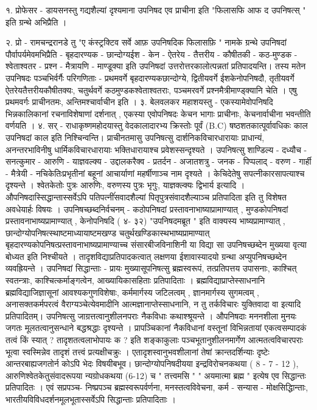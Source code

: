१. प्रोफेसर - डायसनस्तु गद्यशैल्यां दृश्यमाना उपनिषद एव प्राचीना इति "फिलासफि आफ द उपनिषत्स् " इति ग्रन्थे अभिप्रैति । 

२. प्रो - रामचन्द्ररानडे तु "ए कंस्ट्रक्टिव सर्वे आफ़ उपनिषदिक फिलासफ़ि " नामके ग्रन्थे उपनिषदां पौर्वापर्यमेवमभिप्रैति - बृहदारण्यक - छान्दोग्यईश - केन - ऐतरेय - तैत्तरीय - कौषीतकी - कठ-मुण्डक - श्वेताश्वतर - प्रश्न - मैत्रायणि - माण्डूक्या इति उपनिषदां उत्तरोत्तरकालोत्पन्नतां प्रतिपादयन्ति। तस्य मतेन उपनिषदः पञ्चभिर्वर्गैः परिगणिताः - प्रथमवर्गे बृहदारण्यकछान्दोग्ये, द्वितीयवर्गे ईशकेनोपनिषदौ, तृतीयवर्गे ऐतरेयतैत्तरीयकौषीतक्यः, चतुर्थवर्गे कठमुण्डकश्वेताश्वतराः, पञ्चमरवर्गे प्रश्नमैत्रीमाण्ड्क्यानि चेति । एषु प्रथमवर्गः प्राचीनतमः, अन्तिमश्चार्वाचीन इति । 
३. बेलवलकर महाशयस्तु - एकस्यामेवोपनिषदि भिन्नकालिकानां रचनाविशेषाणां दर्शनात् , एकस्या एवोपनिषदः केचन भागाः प्राचीनाः, केचनार्वाचीना भवन्तीति वर्णयति । 
४. सर् - राधाकृष्णमहोदयास्तु वेदकालादारभ्य क्रिस्तोः पूर्वं (B.C) षष्ठशतकात्पूर्वावधिकः काल उपनिषदां काल इति निश्चिन्वन्ति। 
प्राचीनतमासु उपनिषत्सु दार्शनिकविचारधारायाः प्राधान्यं, अनन्तरभाविनीषु धार्मिकविचारधारायाः भक्तिधारायाश्च प्रवेशस्सन्दृश्यते । 
उपनिषत्सु शाण्डिल्य - दध्यौच - सनत्कुमार - आरुणि - याज्ञवल्क्य -  उद्दालकरैक्व - प्रतर्दन - अजातशत्रु - जनक - पिप्पलाद् - वरुण - गार्ही - मैत्रेयी - नचिकेतिःप्रभृतीनां बहूनां आचार्याणां महर्षीणाञ्च नाम दृश्यते । केचिदेतेषु सपत्नीकारसापत्याश्च दृश्यन्ते । श्वेतकेतोः पुत्रः आरुणिः, वरुणस्य पुत्रः भृगुः, याज्ञक्ल्क्यः द्विभार्य इत्यादि । औपनिषदास्सिद्धान्तास्सर्वेऽपि पतिपत्नींंसवादशैल्यां पितृपुत्रसंवादशैल्याञ्च प्रतिपादिता इति तु विशेषत अवधेयार्हः विषयः । 
उपनिषच्छब्दनिर्वचनम् - 
कठोपनिषदां प्रस्तावनाभाष्याप्रामाण्यात् , मुण्डकोपनिषदां प्रस्तावनाभाष्यप्रामाण्यात् , केनोपनिषदि ( ४- ३२) "उपनिषदमब्रूत " इति वाक्यस्य भाष्यप्रामाण्यात् , छान्दोग्योपनिषत्स्थाष्टमाध्यायाष्टमखण्ड चतुर्थखण्डिकास्थभाष्यप्रामाण्यात् बृहदारण्यकोपनिषत्प्रस्तावनाभाष्यप्रामाण्याच्च संसारबीजविनाशिनी या विद्या सा उपनिषच्छब्देन मुख्यया वृत्या बोध्यत इति निश्चीयते । तादृशविद्याप्रतिपादकत्वात् लक्षणया ईशावास्यादयो ग्रन्था अप्युपनिषच्छब्देन व्यवह्रियन्ते । 
उपनिषदां सिद्धान्ताः -
प्रायः मुख्यासूपनिषत्सु ब्रह्मस्वरूपं, तत्प्रतिपत्तय उपासनाः, काश्चित् स्वतन्त्राः, काश्चित्कर्माङ्गत्वेन, आख्यायिकासहिताः प्रतिपादिताः । ब्रह्मविद्याप्राप्तेस्साधनानि ब्रह्मविद्याजिज्ञासूनां आवश्यकगुणविशेषाः, कर्ममार्गस्य जटिलत्वम् , ज्ञानमार्गस्य सुगमत्वम् , अनासक्तकर्मपरत्वं वैराग्यञ्चेत्येवमादीनि आत्मज्ञानाप्तेस्साधनानि, न तु तर्कविचारः युक्तिवादा वा इत्यादि प्रतिपादितम्। 
उपनिषत्सु जाग्रत्तत्वानुशीलनपराः नैकविधाः कथाश्श्रूयन्ते । औपनिषदाः मननशीला मुनयः जगतः मूलतत्वानुसन्धाने बद्धश्रद्धाः दृश्यन्ते । प्रापञ्चिकानां नैकविधानां वस्तूनां विभिन्नतायां एकत्वसम्पादकं तत्वं किं स्यात् ? तादृशतत्वलाभोपायः क ? इति शङ्काकुलाः पञ्चभूतानुशीलनमार्गेण आत्मतत्वविचारपराः भूत्वा स्वस्मिन्नेव तादृशं तत्त्वं प्रत्यक्षीचक्रुः । एतादृशस्वानुभवशीलानां तेषां क्रान्तदर्शिन्याः दृष्टेः आन्तरबाह्यजगतोर्न कोऽपि भेदः विषयीबभूव। छान्दोग्योपनिषदीयया इन्द्रविरोचनकथया ( 8 - 7 - 12 ), आरुणिश्वेतकेतुसंवादरूपया न्यग्रोधकथया (6-12) च " तत्त्वमसि "  " अयमात्मा ब्रह्म " इत्येष एव सिद्धान्तः प्रतिपादितः । एवं सप्रपञ्च- निष्प्रपञ्च ब्रह्मस्वरूपर्वर्णना, मनस्तत्वविवेचना, कर्म -  सन्यास - मोक्षसिद्धिान्ताः, भारतीयविविधदर्शनमूलभूतास्सर्वेऽपि सिद्धान्ताः प्रतिपादिताः । 
